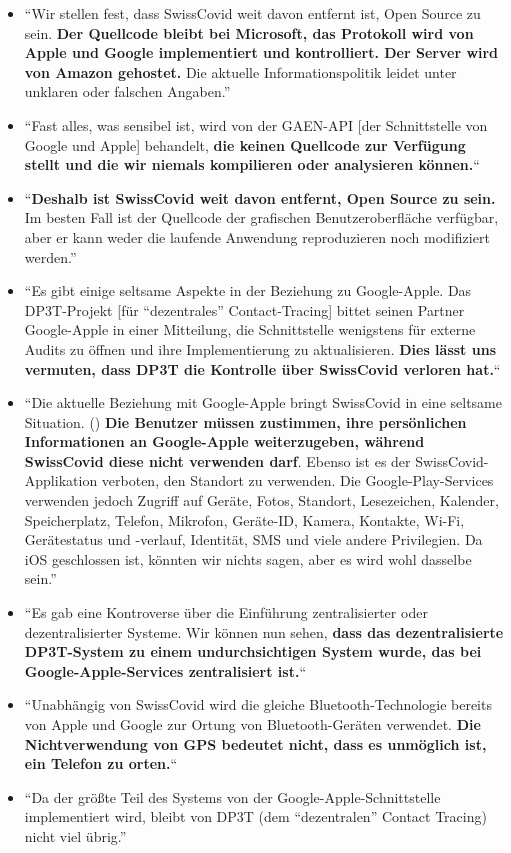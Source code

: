\begin{itemize}
\tightlist
\item
  ``Wir stellen fest, dass SwissCovid weit davon entfernt ist, Open
  Source zu sein. \textbf{Der Quellcode bleibt bei Microsoft, das
  Protokoll wird von Apple und Google implementiert und kontrolliert.
  Der Server wird von Amazon gehostet.} Die aktuelle Informationspolitik
  leidet unter unklaren oder falschen Angaben.''
\item
  ``Fast alles, was sensibel ist, wird von der GAEN-API {[}der
  Schnittstelle von Google und Apple{]} behandelt, \textbf{die keinen
  Quellcode zur Verfügung stellt und die wir niemals kompilieren oder
  analysieren können.}``
\item
  ``\textbf{Deshalb ist SwissCovid weit davon entfernt, Open Source zu
  sein.} Im besten Fall ist der Quellcode der grafischen
  Benutzeroberfläche verfügbar, aber er kann weder die laufende
  Anwendung reproduzieren noch modifiziert werden.''
\item
  ``Es gibt einige seltsame Aspekte in der Beziehung zu Google-Apple.
  Das DP3T-Projekt {[}für ``dezentrales'' Contact-Tracing{]} bittet
  seinen Partner Google-Apple in einer Mitteilung, die Schnittstelle
  wenigstens für externe Audits zu öffnen und ihre Implementierung zu
  aktualisieren. \textbf{Dies lässt uns vermuten, dass DP3T die
  Kontrolle über SwissCovid verloren hat.}``
\item
  ``Die aktuelle Beziehung mit Google-Apple bringt SwissCovid in eine
  seltsame Situation. () \textbf{Die Benutzer müssen zustimmen, ihre
  persönlichen Informationen an Google-Apple weiter­zu­geben, während
  SwissCovid diese nicht verwenden darf}. Ebenso ist es der
  SwissCovid-Applikation verboten, den Standort zu verwenden. Die
  Google-Play-Services verwenden jedoch Zugriff auf Geräte, Fotos,
  Standort, Lesezeichen, Kalender, Speicherplatz, Telefon, Mikrofon,
  Geräte-ID, Kamera, Kontakte, Wi-Fi, Gerätestatus und -verlauf,
  Identität, SMS und viele andere Privilegien. Da iOS geschlossen ist,
  könnten wir nichts sagen, aber es wird wohl dasselbe sein.''
\item
  ``Es gab eine Kontroverse über die Einführung zentralisierter oder
  dezentralisierter Systeme. Wir können nun sehen, \textbf{dass das
  dezentralisierte DP3T-System zu einem undurchsichtigen System wurde,
  das bei Google-Apple-Services zentralisiert ist.}``
\item
  ``Unabhängig von SwissCovid wird die gleiche Bluetooth-Technologie
  bereits von Apple und Google zur Ortung von Bluetooth-Geräten
  verwendet. \textbf{Die Nichtverwendung von GPS bedeutet nicht, dass es
  unmöglich ist, ein Telefon zu orten.}``
\item
  ``Da der größte Teil des Systems von der Google-Apple-Schnittstelle
  implementiert wird, bleibt von DP3T (dem ``dezentralen'' Contact
  Tracing) nicht viel übrig.''
\end{itemize}

